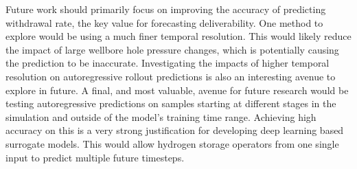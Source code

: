 Future work should primarily focus on improving the accuracy of predicting withdrawal rate, the key value for forecasting deliverability. One method to explore would be using a much finer temporal resolution. This would likely reduce the impact of large wellbore hole pressure changes, which is potentially causing the prediction to be inaccurate. Investigating the impacts of higher temporal resolution on autoregressive rollout predictions is also an interesting avenue to explore in future. A final, and most valuable, avenue for future research would be testing autoregressive predictions on samples starting at different stages in the simulation and outside of the model's training time range. Achieving high accuracy on this is a very strong justification for developing deep learning based surrogate models. This would allow hydrogen storage operators from one single input to predict multiple future timesteps. 